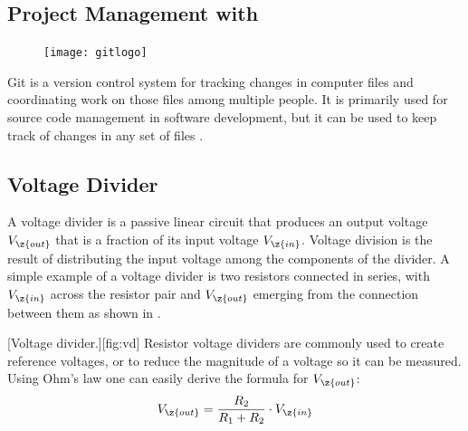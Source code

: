 \cleardoublepage
\subsection{Project Management with}\label{sec:git}
\begin{figure}[h!]\vspace*{-1.43cm}\hspace*{6.7cm}\texttt{[image: gitlogo]}\end{figure}\vspace*{-.4cm}\noindent
Git is a version control system for tracking changes in computer files and coordinating work on those files among multiple people. It is primarily used for source code management in software development, but it can be used to keep track of changes in any set of files \cite{wiki:2}.\par

\subsection{Voltage Divider}\label{sec:vd}
A voltage divider is a passive linear circuit that produces an output voltage $V_{\z{out}}$ that is a fraction of its input voltage $V_{\z{in}}$. Voltage division is the result of distributing the input voltage among the components of the divider. A simple example of a voltage divider is two resistors connected in series, with $V_{\z{in}}$ across the resistor pair and $V_{\z{out}}$ emerging from the connection between them as shown in .\par
{}[Voltage divider.][fig:vd]
Resistor voltage dividers are commonly used to create reference voltages, or to reduce the magnitude of a voltage so it can be measured. Using Ohm's law one can easily derive the formula for $V_{\z{out}}$:
\begin{equation}
	V_{\z{out}} = \frac{R_{2}}{R_{1} + R_{2}}\cdot V_{\z{in}}\label{eq:vd}
\end{equation}

